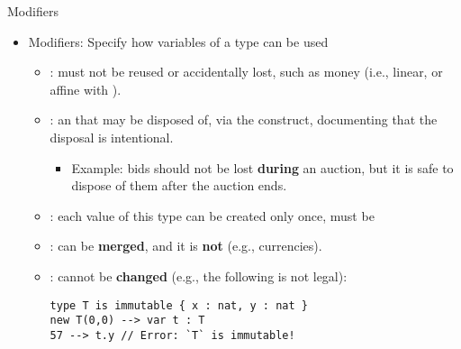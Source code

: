 \documentclass[leqno,presentation,usenames,dvipsnames]{beamer}
\begin{document}
\begin{frame}[fragile]{Modifiers}
    \begin{itemize}
        \item Modifiers: Specify how variables of a type can be used
        \begin{itemize}
            \item {}: must not be reused or accidentally lost, such as money (i.e., linear, or affine with ).
            \item {}: an  that may be disposed of, via the  construct, documenting that the disposal is intentional.
                \begin{itemize}
                    \item Example: bids should not be lost \textbf{during} an auction, but it is safe to dispose of them after the auction ends.
                \end{itemize}
            \item {}: each value of this type can be created only once, must be 
            \item {}: can be \textbf{merged}, and it is \textbf{not}  (e.g., currencies).
            \item {}: cannot be \textbf{changed} (e.g., the following is not legal):
\begin{lstlisting}[language=flow, xleftmargin=0.4em, basicstyle=\footnotesize\ttfamily]
type T is immutable { x : nat, y : nat }
new T(0,0) --> var t : T
57 --> t.y // Error: `T` is immutable!
\end{lstlisting}
        \end{itemize}
    \end{itemize}
\end{frame}
\end{document}
